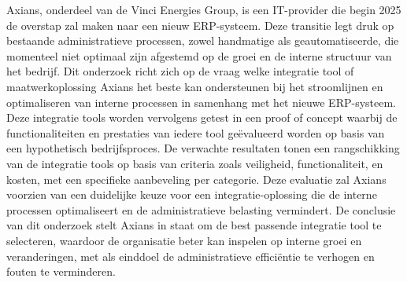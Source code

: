 Axians, onderdeel van de Vinci Energies Group, is een IT-provider die begin 2025 de overstap zal maken naar een nieuw ERP-systeem. Deze transitie legt druk op bestaande administratieve processen, zowel handmatige als geautomatiseerde, die momenteel niet optimaal zijn afgestemd op de groei en de interne structuur van het bedrijf. Dit onderzoek richt zich op de vraag welke integratie tool of maatwerkoplossing Axians het beste kan ondersteunen bij het stroomlijnen en optimaliseren van interne processen in samenhang met het nieuwe ERP-systeem. Deze integratie tools worden vervolgens getest in een proof of concept waarbij de functionaliteiten en prestaties van iedere tool geëvalueerd worden op basis van een hypothetisch bedrijfsproces. De verwachte resultaten tonen een rangschikking van de integratie tools op basis van criteria zoals veiligheid, functionaliteit, en kosten, met een specifieke aanbeveling per categorie. Deze evaluatie zal Axians voorzien van een duidelijke keuze voor een integratie-oplossing die de interne processen optimaliseert en de administratieve belasting vermindert. De conclusie van dit onderzoek stelt Axians in staat om de best passende integratie tool te selecteren, waardoor de organisatie beter kan inspelen op interne groei en veranderingen, met als einddoel de administratieve efficiëntie te verhogen en fouten te verminderen.
